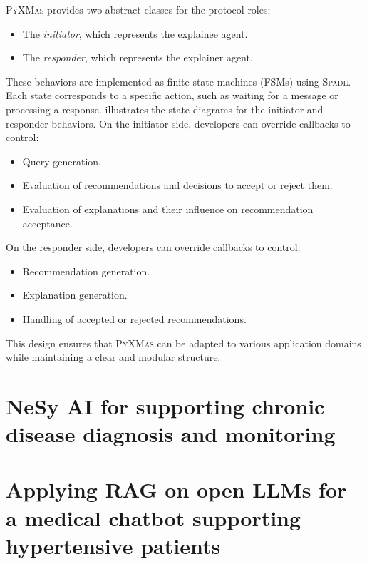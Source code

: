 %
\textsc{PyXMas} provides two abstract classes for the protocol roles:
%
\begin{itemize}
    \item The \emph{initiator}, which represents the explainee agent.
    \item The \emph{responder}, which represents the explainer agent.
\end{itemize}
%
These behaviors are implemented as finite-state machines (FSMs) using \textsc{Spade}.
%
Each state corresponds to a specific action, such as waiting for a message or processing a response.
%
 illustrates the state diagrams for the initiator and responder behaviors.
%
On the initiator side, developers can override callbacks to control:
%
\begin{itemize}
    \item Query generation.
    \item Evaluation of recommendations and decisions to accept or reject them.
    \item Evaluation of explanations and their influence on recommendation acceptance.
\end{itemize}
%
On the responder side, developers can override callbacks to control:
%
\begin{itemize}
    \item Recommendation generation.
    \item Explanation generation.
    \item Handling of accepted or rejected recommendations.
\end{itemize}
%
This design ensures that \textsc{PyXMas} can be adapted to various application domains while maintaining a clear and modular structure.



\section{NeSy \Gls{AI} for supporting chronic disease diagnosis and monitoring}\label{sec:nesy-ai-for-supporting-chronic-disease-diagnosis-and-monitoring}



\section{Applying \Gls{RAG} on open \Glspl{LLM} for a medical chatbot supporting hypertensive patients}\label{sec:applying-rag-on-open-llm-for-a-medical-chatbot-supporting-hypertensive-patients}